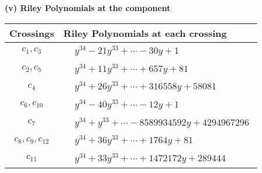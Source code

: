 \documentclass[1p]{elsarticle_modified}
\theoremstyle{definition}
\begin{document}
\flushleft \textbf{(v) Riley Polynomials at the component}\newline \\
\begin{tabular}{m{50pt}|m{274pt}}
Crossings & \hspace{64pt}Riley Polynomials at each crossing \\
\hline $$\begin{aligned}c_{1},c_{3}\end{aligned}$$&$\begin{aligned}
&y^{34}-21 y^{33}+\cdots-30 y+1
\end{aligned}$\\
\hline $$\begin{aligned}c_{2},c_{5}\end{aligned}$$&$\begin{aligned}
&y^{34}+11 y^{33}+\cdots+657 y+81
\end{aligned}$\\
\hline $$\begin{aligned}c_{4}\end{aligned}$$&$\begin{aligned}
&y^{34}+26 y^{33}+\cdots+316558 y+58081
\end{aligned}$\\
\hline $$\begin{aligned}c_{6},c_{10}\end{aligned}$$&$\begin{aligned}
&y^{34}-40 y^{33}+\cdots-12 y+1
\end{aligned}$\\
\hline $$\begin{aligned}c_{7}\end{aligned}$$&$\begin{aligned}
&y^{34}+y^{33}+\cdots-8589934592 y+4294967296
\end{aligned}$\\
\hline $$\begin{aligned}c_{8},c_{9},c_{12}\end{aligned}$$&$\begin{aligned}
&y^{34}+36 y^{33}+\cdots+1764 y+81
\end{aligned}$\\
\hline $$\begin{aligned}c_{11}\end{aligned}$$&$\begin{aligned}
&y^{34}+33 y^{33}+\cdots+1472172 y+289444
\end{aligned}$\\
\hline
\end{tabular}\\~\\
\end{document}
